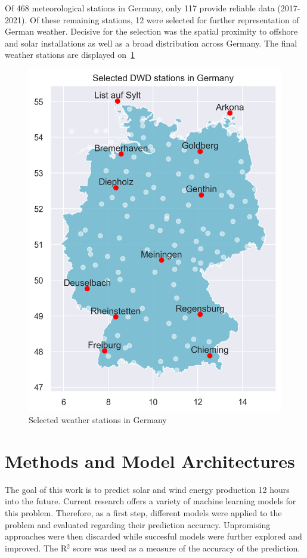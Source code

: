 \documentclass[11pt,table]{article}
\begin{document}
Of 468 meteorological stations in Germany, only 117 provide reliable data (2017-2021). Of these remaining stations, 12 were selected for further representation of German weather. Decisive for the selection was the spatial proximity to offshore and solar installations as well as a broad distribution across Germany. The final weather stations are displayed on~\ref{fig:weatherStations}
\begin{figure}[H]
	\centering
	\includegraphics[scale=0.5]{Figures/weatherStations.png}
	\caption{Selected weather stations in Germany}
	\label{fig:weatherStations}
\end{figure}

\section{Methods and Model Architectures}

The goal of this work is to predict solar and wind energy production 12 hours into the future. Current research offers a variety of machine learning models for this problem. Therefore, as a first step, different models were applied to the problem and evaluated regarding their prediction accuracy. Unpromising approaches were then discarded while succesful models were further explored and improved. The R$^2$ score was used as a measure of the accuracy of the prediction.
\end{document}
